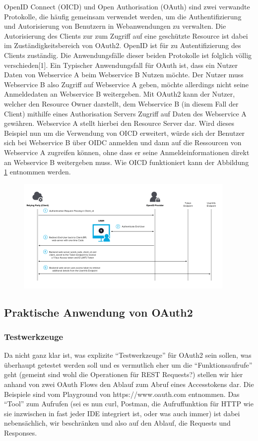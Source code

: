 \documentclass[notitlepage, hidelinks]{article}
\begin{document}
OpenID Connect (OICD) und Open Authorisation (OAuth) sind zwei verwandte Protokolle, die häufig gemeinsam verwendet werden, um die Authentifizierung und Autorisierung von Benutzern in Webanwendungen zu verwalten. Die Autorisierung des Clients zur zum Zugriff auf eine geschützte Resource ist dabei im Zuständigkeitsbereich von OAuth2. OpenID ist für zu Autentifizierung des Clients zuständig. Die Anwendungsfälle dieser beiden Protokolle ist folglich völlig verschieden[1]. Ein Typischer Anwendungsfall für OAuth ist, dass ein Nutzer Daten von Webservice A beim Webservice B Nutzen möchte. Der Nutzer muss Webservice B also Zugriff auf Webservice A geben, möchte allerdings nicht seine Anmeldedaten an Webservice B weitergeben. Mit OAuth2 kann der Nutzer, welcher den Resource Owner darstellt, dem Webservice B (in diesem Fall der Client) mithilfe eines Authorisation Servers Zugriff auf Daten des Webservice A gewähren. Webservice A stellt hierbei den Resource Server dar. Wird dieses Beispiel nun um die Verwendung von OICD erweitert, würde sich der Benutzer sich bei Webservice B über OIDC anmelden und dann auf die Ressourcen von Webservice A zugreifen können, ohne dass er seine Anmeldeinformationen direkt an Webservice B weitergeben muss. Wie OICD funktioniert kann der Abbildung \ref{fig:oicd} entnommen werden.


\begin{figure}[H]
\centering
  \includegraphics[width=400px]{images/oidc.png}
  \caption{}
  \label{fig:oicd}
\end{figure}


\subsection{Praktische Anwendung von OAuth2}
\subsubsection{Testwerkzeuge}
Da nicht ganz klar ist, was explizite ``Testwerkzeuge'' für OAuth2 sein sollen, was überhaupt getestet werden soll und es vermutlich eher um die ``Funktionsaufrufe'' geht (gemeint sind wohl die Operationen für REST Requests?) stellen wir hier anhand von zwei OAuth Flows den Ablauf zum Abruf eines Accesstokens dar. Die Beispiele sind vom Playground von https://www.oauth.com entnommen. Das ``Tool'' zum Aufrufen (sei es nun curl, Postman, die Aufruffunktion für HTTP wie sie inzwischen in fast jeder IDE integriert ist, oder was auch immer) ist dabei nebensächlich, wir beschränken und also auf den Ablauf, die Requests und Responses.
\end{document}
